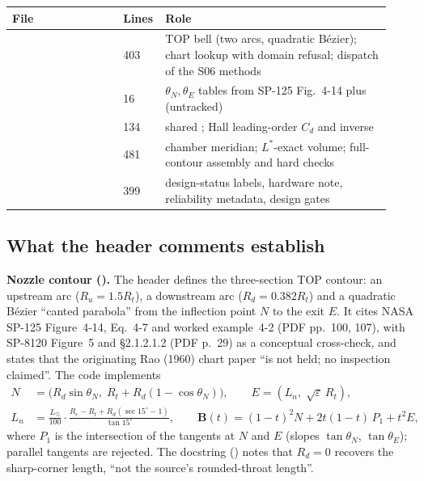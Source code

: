 \begingroup\small
\begin{longtable}{@{}P{0.29\linewidth}P{0.06\linewidth}P{0.58\linewidth}@{}}
\toprule
\textbf{File} & \textbf{Lines} & \textbf{Role} \\ \midrule
\endhead
{} & 403 & TOP bell (two arcs, quadratic B\'ezier); chart lookup with domain refusal; dispatch of the S06 methods \\
 & 16 & $\theta_N,\theta_E$ tables from SP-125 Fig.~4-14 plus  (untracked) \\
 & 134 & shared ; Hall leading-order $C_d$ and inverse \\
 & 481 & chamber meridian; $L^*$-exact volume; full-contour assembly and hard checks \\
 & 399 & design-status labels, hardware note, reliability metadata, design gates \\
\bottomrule
\end{longtable}
\endgroup

\subsection{What the header comments establish}

\textbf{Nozzle contour ().} The header defines the three-section TOP contour: an
upstream arc ($R_u = 1.5R_t$), a downstream arc ($R_d = 0.382R_t$) and a quadratic B\'ezier ``canted
parabola'' from the inflection point $N$ to the exit $E$. It cites NASA SP-125 Figure~4-14, Eq.~4-7 and worked
example~4-2 (PDF pp.~100, 107), with SP-8120 Figure~5 and \S2.1.2.1.2 (PDF p.~29) as a conceptual cross-check,
and states that the originating Rao (1960) chart paper ``is not held; no inspection claimed''. The code
implements
\begin{align}
N &= \bigl(R_d\sin\theta_N,\; R_t + R_d(1-\cos\theta_N)\bigr), \qquad E = (L_n,\; \sqrt{\varepsilon}\,R_t),\\
L_n &= \frac{L_\%}{100}\cdot\frac{R_e - R_t + R_d(\sec 15^\circ - 1)}{\tan 15^\circ},\qquad
\mathbf{B}(t) = (1-t)^2 N + 2t(1-t)\,P_1 + t^2 E ,
\end{align}
where $P_1$ is the intersection of the tangents at $N$ and $E$ (slopes $\tan\theta_N$, $\tan\theta_E$); parallel
tangents are rejected. The  docstring () notes that $R_d = 0$ recovers the
sharp-corner length, ``not the source's rounded-throat length''.

